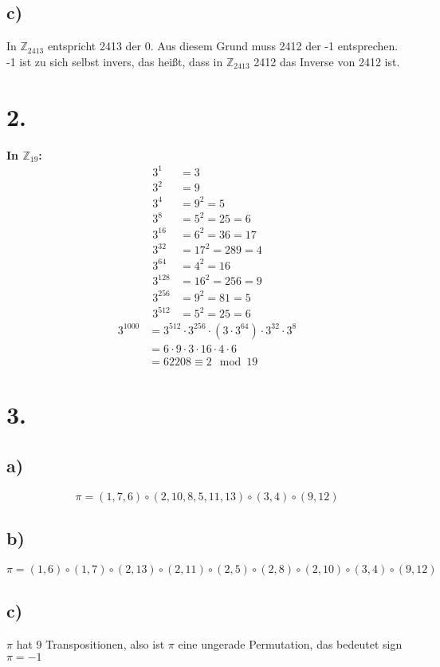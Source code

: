 \documentclass[a4paper]{scrartcl}
\begin{document}
	\subsection{c)}
		In \(\mathbb{Z}_{2413}\) entspricht 2413 der 0. Aus diesem Grund muss 2412 der -1 
		entsprechen. -1 ist zu sich selbst invers, das heißt, dass in \(\mathbb{Z}_{2413}\) 2412 das 
		Inverse von 2412 ist.

\section{2.}
	\textbf{In \(\mathbb{Z}_{19}\):}
	\begin{align}
		3^1&=3 \\
		3^2&=9 \\
		3^4&=9^2=5 \\
		3^8&=5^2=25=6 \\
		3^{16}&=6^2=36=17 \\
		3^{32}&=17^2=289=4 \\
		3^{64}&=4^2=16 \\
		3^{128}&=16^2=256=9 \\
		3^{256}&=9^2=81=5 \\
		3^{512}&=5^2=25=6		
	\end{align}
	\begin{align}
		3^{1000}&= 3^{512}\cdot 3^{256} \cdot (3\cdot 3^{64})\cdot 3^32\cdot 3^8 \\
		&=6\cdot 9\cdot 3\cdot 16\cdot 4\cdot 6 \\
		&= 62208 \equiv 2 \mod 19
	\end{align}
	
\section{3.}
	\subsection{a)}
		\[\pi = (1,7,6)\circ (2,10,8,5,11,13)\circ (3,4)\circ(9,12)\]
		
	\subsection{b)}
		\[\pi= (1,6)\circ(1,7)\circ(2,13)\circ(2,11)\circ(2,5)\circ(2,8)\circ(2,10)
		\circ(3,4)\circ(9,12)\]
	
	\subsection{c)}
		\(\pi\) hat 9  Transpositionen, also ist \(\pi\) eine ungerade Permutation, das bedeutet sign 
		\(\pi = -1\)
\end{document}
